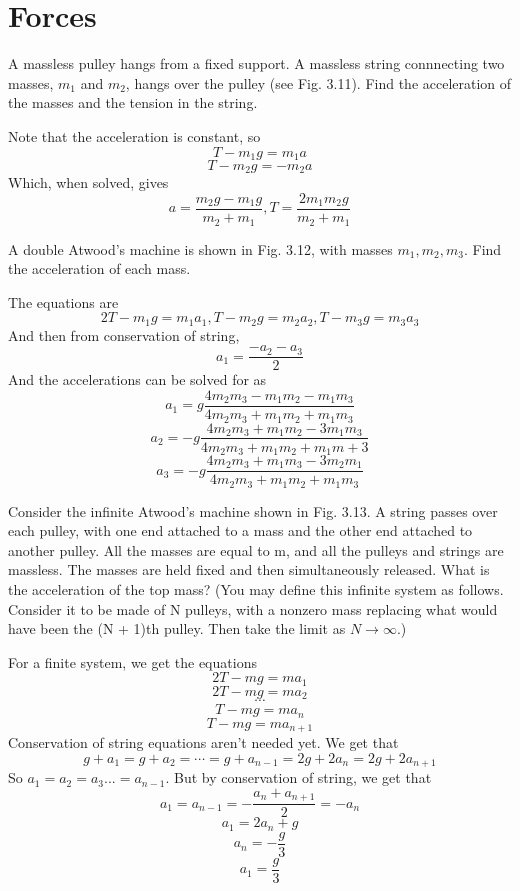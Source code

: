 \documentclass[11pt]{scrartcl}
\begin{document}
\section{Forces}
\begin{example}
  [3.1]
  A massless pulley hangs from a fixed support. A massless string connnecting
  two masses, $m_1$ and $m_2$, hangs over the pulley (see Fig. 3.11).
  Find the acceleration of the masses and the tension in the string.
\end{example}
\begin{soln}
  Note that the acceleration is constant, so
  $$T-m_1g=m_1a$$
  $$T-m_2g=-m_2a$$
  Which, when solved, gives
  $$a=\frac{m_2g-m_1g}{m_2+m_1}, T=\frac{2m_1m_2g}{m_2+m_1}$$
\end{soln}
\begin{example}
  [3.2]
  A double Atwood's machine is shown in Fig. 3.12, with masses $m_1, m_2, m_3$.
  Find the acceleration of each mass.
\end{example}
\begin{soln}
  The equations are
  $$2T-m_1g=m_1a_1, T-m_2g=m_2a_2, T-m_3g=m_3a_3$$
  And then from conservation of string,
  $$a_1=\frac{-a_2-a_3}{2}$$
  And the accelerations can be solved for as
  $$a_1=g\frac{4m_2m_3-m_1m_2-m_1m_3}{4m_2m_3+m_1m_2+m_1m_3}$$
  $$a_2=-g\frac{4m_2m_3+m_1m_2-3m_1m_3}{4m_2m_3+m_1m_2+m_1m+3}$$
  $$a_3=-g\frac{4m_2m_3+m_1m_3-3m_2m_1}{4m_2m_3+m_1m_2+m_1m_3}$$
\end{soln}
\begin{example}
  [3.3]
  Consider the infinite Atwood’s machine shown in Fig. 3.13. A string
  passes over each pulley, with one end attached to a mass and the other
  end attached to another pulley. All the masses are equal to m, and all
  the pulleys and strings are massless. The masses are held fixed and then
  simultaneously released. What is the acceleration of the top mass? (You
  may define this infinite system as follows. Consider it to be made of
  N pulleys, with a nonzero mass replacing what would have been the
  (N + 1)th pulley. Then take the limit as $N\to\infty$.)
\end{example}
\begin{soln}
  For a finite system, we get the equations
  $$2T-mg=ma_1$$
  $$2T-mg=ma_2$$
  $$\cdots$$
  $$T-mg=ma_{n}$$
  $$T-mg=ma_{n+1}$$
  Conservation of string equations aren't needed yet. We get that
  $$g+a_1=g+a_2=\cdots=g+a_{n-1}=2g+2a_n=2g+2a_{n+1}$$
  So $a_1=a_2=a_3...=a_{n-1}$. But by conservation of string, we get that
  $$a_1=a_{n-1}=-\frac{a_n+a_{n+1}}{2}=-a_n$$
  $$a_1=2a_n+g$$
  $$a_n=-\frac{g}{3}$$
  $$a_1=\frac{g}{3}$$
\end{soln}
\end{document}
